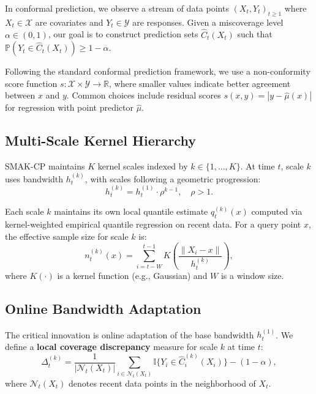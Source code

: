 \documentclass{article}
\theoremstyle{definition}
\begin{document}
In conformal prediction, we observe a stream of data points $(X_t, Y_t)_{t \geq 1}$ where $X_t \in \mathcal{X}$ are covariates and $Y_t \in \mathcal{Y}$ are responses. Given a miscoverage level $\alpha \in (0, 1)$, our goal is to construct prediction sets $\hat{C}_t(X_t)$ such that $\mathbb{P}(Y_t \in \hat{C}_t(X_t)) \geq 1 - \alpha$.

Following the standard conformal prediction framework, we use a non-conformity score function $s: \mathcal{X} \times \mathcal{Y} \to \mathbb{R}$, where smaller values indicate better agreement between $x$ and $y$. Common choices include residual scores $s(x, y) = |y - \hat{\mu}(x)|$ for regression with point predictor $\hat{\mu}$.

\subsection{Multi-Scale Kernel Hierarchy}

SMAK-CP maintains $K$ kernel scales indexed by $k \in \{1, \ldots, K\}$. At time $t$, scale $k$ uses bandwidth $h_t^{(k)}$, with scales following a geometric progression:
\begin{equation}
h_t^{(k)} = h_t^{(1)} \cdot \rho^{k-1}, \quad \rho > 1.
\end{equation}

Each scale $k$ maintains its own local quantile estimate $q_t^{(k)}(x)$ computed via kernel-weighted empirical quantile regression on recent data. For a query point $x$, the effective sample size for scale $k$ is:
\begin{equation}
n_t^{(k)}(x) = \sum_{i=t-W}^{t-1} K\left(\frac{\|X_i - x\|}{h_t^{(k)}}\right),
\end{equation}
where $K(\cdot)$ is a kernel function (e.g., Gaussian) and $W$ is a window size.

\subsection{Online Bandwidth Adaptation}

The critical innovation is online adaptation of the base bandwidth $h_t^{(1)}$. We define a \textbf{local coverage discrepancy} measure for scale $k$ at time $t$:
\begin{equation}
\Delta_t^{(k)} = \frac{1}{|\mathcal{N}_t(X_t)|} \sum_{i \in \mathcal{N}_t(X_t)} \mathbb{I}\{Y_i \in \hat{C}_i^{(k)}(X_i)\} - (1-\alpha),
\end{equation}
where $\mathcal{N}_t(X_t)$ denotes recent data points in the neighborhood of $X_t$.
\end{document}
